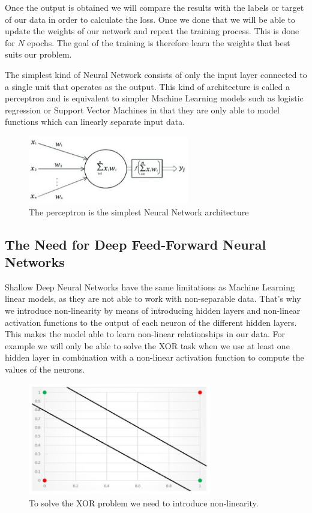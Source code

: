 Once the output is obtained we will compare the results with the labels or target of our data in order to calculate the loss. Once we done that we will be able to update the weights of our network and repeat the training process. This is done for $N$ epochs. The goal of the training is therefore learn the weights that best suits our problem.

\newpage
\noindent The simplest kind of Neural Network consists of only the input layer connected to a single unit that operates as the output. This kind of architecture is called a perceptron and is equivalent to simpler Machine Learning models such as logistic regression or Support Vector Machines in that they are only able to model functions which can linearly separate input data.

\begin{figure}[h]
    \centering
    \includegraphics[width=7cm]{Images/perceptron.jpg}
    \caption{The perceptron is the simplest Neural Network architecture}
\end{figure}


\subsection{The Need for Deep Feed-Forward Neural Networks}

Shallow Deep Neural Networks have the same limitations as Machine Learning linear models, as they are not able to work with non-separable data. That's why we introduce non-linearity by means of introducing hidden layers and non-linear activation functions to the output of each neuron of the different hidden layers. This makes the model able to learn non-linear relationships in our data. For example we will only be able to solve the XOR task when we use at least one hidden layer in combination with a non-linear activation function to compute the values of the neurons. 

\begin{figure}[h]
    \centering
    \includegraphics[width=8cm]{Images/xor.jpg}
    \caption{To solve the XOR problem we need to introduce non-linearity.}
    \label{fig:xor}
\end{figure}

